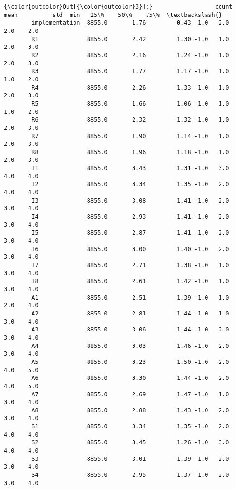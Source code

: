 \documentclass[11pt]{article}
\begin{document}
            \begin{Verbatim}[commandchars=\\\{\}]
{\color{outcolor}Out[{\color{outcolor}3}]:}                  count       mean          std  min   25\%    50\%    75\%  \textbackslash{}
        implementation  8855.0       1.76         0.43  1.0   2.0    2.0    2.0   
        R1              8855.0       2.42         1.30 -1.0   1.0    2.0    3.0   
        R2              8855.0       2.16         1.24 -1.0   1.0    2.0    3.0   
        R3              8855.0       1.77         1.17 -1.0   1.0    1.0    2.0   
        R4              8855.0       2.26         1.33 -1.0   1.0    2.0    3.0   
        R5              8855.0       1.66         1.06 -1.0   1.0    1.0    2.0   
        R6              8855.0       2.32         1.32 -1.0   1.0    2.0    3.0   
        R7              8855.0       1.90         1.14 -1.0   1.0    2.0    3.0   
        R8              8855.0       1.96         1.18 -1.0   1.0    2.0    3.0   
        I1              8855.0       3.43         1.31 -1.0   3.0    4.0    4.0   
        I2              8855.0       3.34         1.35 -1.0   2.0    4.0    4.0   
        I3              8855.0       3.08         1.41 -1.0   2.0    3.0    4.0   
        I4              8855.0       2.93         1.41 -1.0   2.0    3.0    4.0   
        I5              8855.0       2.87         1.41 -1.0   2.0    3.0    4.0   
        I6              8855.0       3.00         1.40 -1.0   2.0    3.0    4.0   
        I7              8855.0       2.71         1.38 -1.0   1.0    3.0    4.0   
        I8              8855.0       2.61         1.42 -1.0   1.0    3.0    4.0   
        A1              8855.0       2.51         1.39 -1.0   1.0    2.0    4.0   
        A2              8855.0       2.81         1.44 -1.0   1.0    3.0    4.0   
        A3              8855.0       3.06         1.44 -1.0   2.0    3.0    4.0   
        A4              8855.0       3.03         1.46 -1.0   2.0    3.0    4.0   
        A5              8855.0       3.23         1.50 -1.0   2.0    4.0    5.0   
        A6              8855.0       3.30         1.44 -1.0   2.0    4.0    5.0   
        A7              8855.0       2.69         1.47 -1.0   1.0    3.0    4.0   
        A8              8855.0       2.88         1.43 -1.0   2.0    3.0    4.0   
        S1              8855.0       3.34         1.35 -1.0   2.0    4.0    4.0   
        S2              8855.0       3.45         1.26 -1.0   3.0    4.0    4.0   
        S3              8855.0       3.01         1.39 -1.0   2.0    3.0    4.0   
        S4              8855.0       2.95         1.37 -1.0   2.0    3.0    4.0   

\end{Verbatim}
\end{document}
